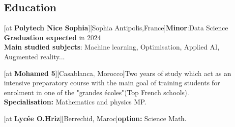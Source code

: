 \documentclass[a4paper]{hamza-cv}
\begin{document}
\begin{textblock}{20.5}
\begin{minipage}[t]{0.37\textwidth}

      
      

  \end{minipage}\hfill\begin{minipage}[t]{0.61\textwidth}

  
    \section{Education}
    
          \begin{rightenv}
        [at \textbf{Polytech Nice Sophia}][Sophia Antipolis,France]{\textbf{Minor}:Data Science\\\textbf{Graduation expected} in 2024 \\ \textbf{Main studied subjects}: Machine learning, Optimisation, Applied AI, Augmented reality...}

        [at \textbf{Mohamed 5}][Casablanca, Morocco]{Two years of study which act as an intensive preparatory course with the main goal of training students for enrolment in one of the "grandes écoles"(Top French schools).\\ \textbf{Specialisation:} Mathematics and physics MP.}

        [at \textbf{Lycée O.Hriz}][Berrechid, Maroc]{\textbf{option:} Science Math.}
      \end{rightenv}
      


\end{minipage}
\end{textblock}
\end{document}
